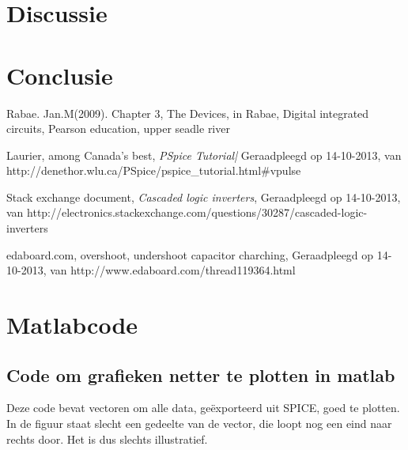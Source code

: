 \documentclass{report}
\begin{document}
\chapter {Discussie}
%

\chapter{Conclusie}
%

\begin{thebibliography}{La}
%
Rabae. Jan.M(2009). Chapter 3, The Devices, in Rabae, Digital integrated circuits, Pearson education, upper seadle river

Laurier, among Canada's best, \textit{PSpice Tutorial|} Geraadpleegd op 14-10-2013, van http://denethor.wlu.ca/PSpice/pspice\_tutorial.html\#vpulse

Stack exchange document, \textit{Cascaded logic inverters}, Geraadpleegd op 14-10-2013, van http://electronics.stackexchange.com/questions/30287/cascaded-logic-inverters

edaboard.com, overshoot, undershoot capacitor charching, Geraadpleegd op 14-10-2013, van http://www.edaboard.com/thread119364.html

 
\end{thebibliography}

\appendix
\chapter{Matlabcode}
\label{Aa}
\section{Code om grafieken netter te plotten in matlab}
\label{A1}
\tiny
{}
\normalsize
Deze code bevat vectoren om alle data, geëxporteerd uit SPICE, goed te plotten. In de figuur staat slecht een gedeelte van de vector, die loopt nog een eind naar rechts door. Het is dus slechts illustratief. 
\end{document}
